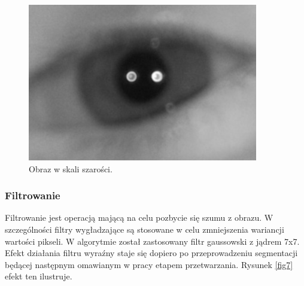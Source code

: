 \begin{figure}[!h]
\centering
\includegraphics[scale=0.25]{images/6.png}
\caption{Obraz w skali szarości. \label{fig6}}
\end{figure}

\newpage
{}
\subsubsection{Filtrowanie}
Filtrowanie jest operacją mającą na celu pozbycie się szumu z obrazu. W szczególności filtry wygładzające są stosowane w celu zmniejszenia wariancji wartości pikseli. W algorytmie został zastosowany filtr gaussowski z jądrem 7x7. Efekt działania filtru wyraźny staje się dopiero po przeprowadzeniu segmentacji będącej następnym omawianym w pracy etapem przetwarzania. Rysunek \ref{fig7} efekt ten ilustruje.

